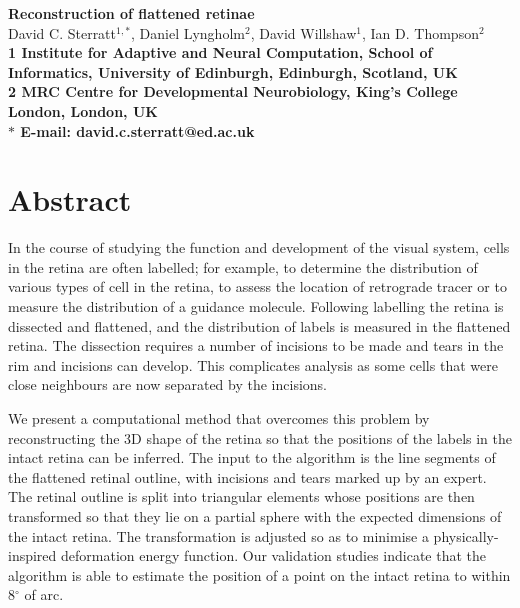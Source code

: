 \documentclass[10pt]{article}
\date{}
\begin{document}
\begin{flushleft}
{\Large
\textbf{Reconstruction of flattened retinae}
}
\\
David C. Sterratt$^{1,\ast}$, Daniel Lyngholm$^{2}$, David
Willshaw$^{1}$, Ian D. Thompson$^{2}$
\\
\bf{1} Institute for Adaptive and Neural Computation, School of
Informatics, University of Edinburgh, Edinburgh, Scotland, UK
\\
\bf{2} MRC Centre for Developmental Neurobiology, King's College
London, London, UK
\\
$\ast$ E-mail: david.c.sterratt@ed.ac.uk
\end{flushleft}

\todolist

\section*{Abstract}




In the course of studying the function and development of the visual
system, cells in the retina are often labelled; for example, to
determine the distribution of various types of cell in the retina, to
assess the location of retrograde tracer or to measure the
distribution of a guidance molecule.  Following labelling the retina
is dissected and flattened, and the distribution of labels is measured
in the flattened retina.  The dissection requires a number of
incisions to be made and tears in the rim and incisions can
develop. This complicates analysis as some cells that were close
neighbours are now separated by the incisions.

We present a computational method that overcomes this problem by
reconstructing the 3D shape of the retina so that the positions of the
labels in the intact retina can be inferred. The input to the
algorithm is the line segments of the flattened retinal outline, with
incisions and tears marked up by an expert. The retinal outline is
split into triangular elements whose positions are then transformed so
that they lie on a partial sphere with the expected dimensions of the
intact retina.  The transformation is adjusted so as to minimise a
physically-inspired deformation energy function. Our validation
studies indicate that the algorithm is able to estimate the position
of a point on the intact retina to within 8$^\circ$ of arc.
\end{document}
